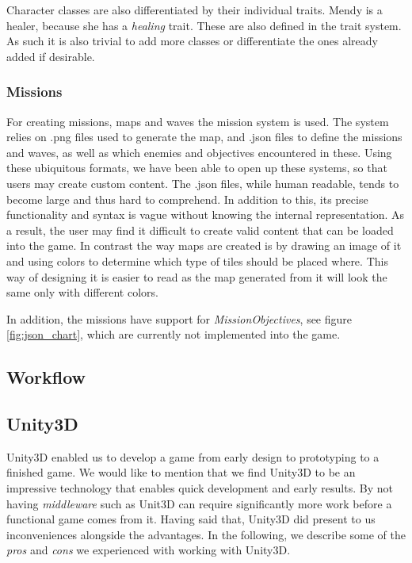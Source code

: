 Character classes are also differentiated by their individual traits.
Mendy is a healer, because she has a \emph{healing} trait.
These are also defined in the trait system.
As such it is also trivial to add more classes or differentiate the ones already added if desirable.

\subsubsection{Missions}\label{dicsussion:missions}
For creating missions, maps and waves the mission system is used.
The system relies on .png files used to generate the map, and .json files to define the missions and waves, as well as which enemies and objectives encountered in these.
Using these ubiquitous formats, we have been able to open up these systems, so that users may create custom content.
The .json files, while human readable, tends to become large and thus hard to comprehend.
In addition to this, its precise functionality and syntax is vague without knowing the internal representation.
As a result, the user may find it difficult to create valid content that can be loaded into the game.
In contrast the way maps are created is by drawing an image of it and using colors to determine which type of tiles should be placed where. This way of designing it is easier to read as the map generated from it will look the same only with different colors.

In addition, the missions have support for \textit{MissionObjectives}, see figure \ref{fig:json_chart}, which are currently not implemented into the game.

\subsection{Workflow}

\subsection{Unity3D}
Unity3D enabled us to develop a game from early design to prototyping to a
finished game. We would like to mention that we find Unity3D to be an
impressive technology that enables quick development and early results. By not
having \textit{middleware} such as Unit3D can require significantly more work
before a functional game comes from it.
Having said that, Unity3D did present to us inconveniences alongside the
advantages. In the following, we describe some of the \textit{pros} and
\textit{cons} we experienced with working with Unity3D.

